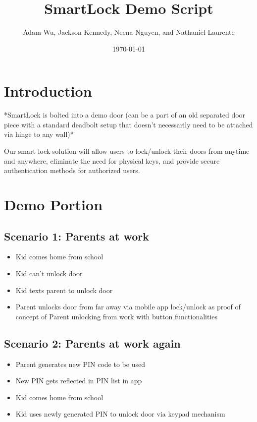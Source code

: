 \documentclass[12pt]{article}
\title{ SmartLock Demo Script }
\author{ Adam Wu, Jackson Kennedy, Neena Nguyen, and Nathaniel Laurente }
\date{\today}
\begin{document}
\maketitle	
\pagebreak

\section{Introduction}

*SmartLock is bolted into a demo door (can be a part of an old separated door piece with a standard deadbolt setup that doesn’t necessarily need to be attached via hinge to any wall)*

Our smart lock solution will allow users to lock/unlock their doors from anytime and anywhere, eliminate the need for physical keys, and provide secure authentication methods for authorized users.

\section{Demo Portion}

\subsection{Scenario 1: Parents at work}
\begin{itemize}
    \item Kid comes home from school
    \item Kid can't unlock door
    \item Kid texts parent to unlock door
    \item Parent unlocks door from far away via mobile app lock/unlock as proof of concept of Parent unlocking from work with button functionalities
\end{itemize}

\subsection{Scenario 2: Parents at work again}
\begin{itemize}
    \item Parent generates new PIN code to be used
    \item New PIN gets reflected in PIN list in app
    \item Kid comes home from school
    \item Kid uses newly generated PIN to unlock door via keypad mechanism
\end{itemize}
\end{document}
